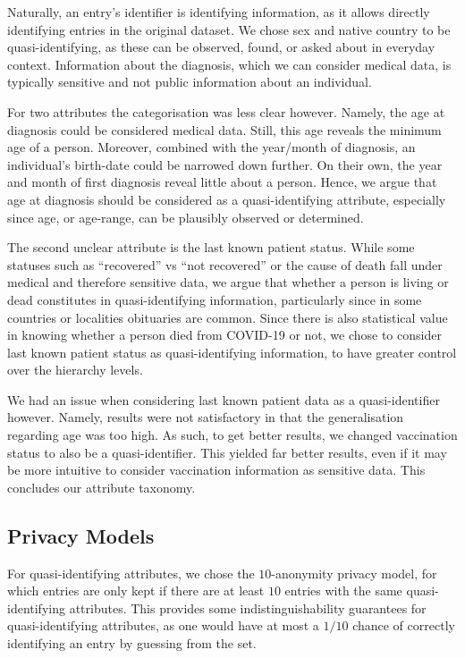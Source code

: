 \documentclass[parskip=half]{scrartcl}
\begin{document}
Naturally, an entry's identifier is identifying information, as it allows
directly identifying entries in the original dataset. We chose sex and native
country to be quasi-identifying, as these can be observed, found, or asked
about in everyday context. Information about the diagnosis, which we can
consider medical data, is typically sensitive and not public information about
an individual.

For two attributes the categorisation was less clear however. Namely, the age
at diagnosis could be considered medical data. Still, this age reveals the
minimum age of a person. Moreover, combined with the year/month of diagnosis,
an individual's birth-date could be narrowed down further. On their own, the
year and month of first diagnosis reveal little about a person. Hence, we argue
that age at diagnosis should be considered as a quasi-identifying attribute,
especially since age, or age-range, can be plausibly observed or determined.

The second unclear attribute is the last known patient status. While some
statuses such as ``recovered'' vs ``not recovered'' or the cause of death fall
under medical and therefore sensitive data, we argue that whether a person is
living or dead constitutes in quasi-identifying information, particularly since
in some countries or localities obituaries are common. Since there is
also statistical value in knowing whether a person died from COVID-19 or not,
we chose to consider last known patient status as quasi-identifying
information, to have greater control over the hierarchy levels.

We had an issue when considering last known patient data as a quasi-identifier
however. Namely, results were not satisfactory in that the generalisation
regarding age was too high. As such, to get better results, we changed
vaccination status to also be a quasi-identifier. This yielded far better
results, even if it may be more intuitive to consider vaccination information
as sensitive data. This concludes our attribute taxonomy.

\subsection{Privacy Models}

For quasi-identifying attributes, we chose the $10$-anonymity privacy model,
for which entries are only kept if there are at least $10$ entries with the
same quasi-identifying attributes. This provides some indistinguishability
guarantees for quasi-identifying attributes, as one would have at most a $1/10$
chance of correctly identifying an entry by guessing from the set.
\end{document}
